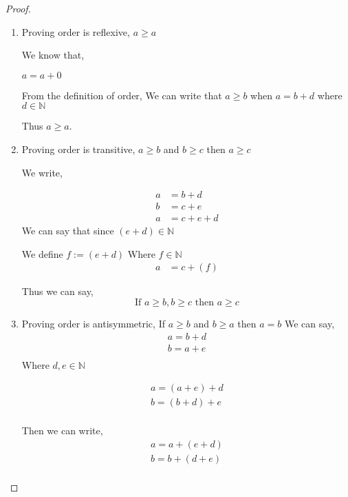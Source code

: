 \documentclass[11pt]{report}
\begin{document}
\begin{proof}
	\begin{enumerate}
		\item Proving order is reflexive, $a \geq a$

		      We know that,

		      $a = a + 0$

		      From the definition of order,
		      We can write that $a \geq b$ when $a = b + d$ where $d \in \mathbb{N}$

		      Thus $a \geq a$.

		\item Proving order is transitive, $a \geq b$ and $b \geq c$ then $a \geq c$

		      We write,

		      \begin{align*}
			      a & = b + d     \\
			      b & = c + e     \\
			      a & = c + e + d
		      \end{align*}
		      We can say that since $(e+d) \in \mathbb{N}$

		      We define $f := (e+d)$
		      Where $f \in \mathbb{N}$
		      \begin{align*}
			      a & = c + (f)
		      \end{align*}

		      Thus we can say,
		      $$\text{If } a \geq b, b \geq c \text{ then } a \geq c$$

		\item Proving order is antisymmetric, If $a \geq b$ and $b \geq a$ then $a=b$
		      We can say,
		      \begin{align*}
			      a = b + d \\
			      b = a + e \\
		      \end{align*}
		      Where $d,e \in \mathbb{N}$

		      \begin{align*}
			      a = (a + e) + d \\
			      b = (b + d) + e \\
		      \end{align*}

		      Then we can write,
		      \begin{align*}
			      a = a + (e + d) \\
			      b = b + (d + e) \\
		      \end{align*}


\end{enumerate}
\end{proof}
\end{document}
